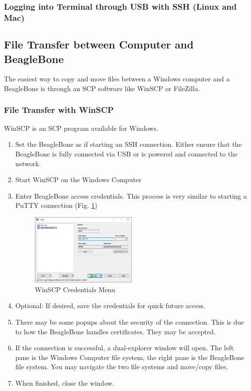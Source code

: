         \subsubsection{Logging into Terminal through USB with SSH (Linux and Mac)}
        
        \subsection{File Transfer between Computer and BeagleBone}
        The easiest way to copy and move files between a Windows computer and a BeagleBone is through an SCP software like WinSCP or FileZilla.
            \subsubsection{File Transfer with WinSCP}
            WinSCP is an SCP program available for Windows.
            \begin{enumerate}
                \item Set the BeagleBone as if starting an SSH connection. Either ensure that the BeagleBone is fully connected via USB or is powered and connected to the network.
                \item Start WinSCP on the Windows Computer
                \item Enter BeagleBone access credentials. This process is very similar to starting a PuTTY connection (Fig. \ref{fig:WinSCPCredentials})
                \begin{figure}[H]
                    \centering
                    \includegraphics[width=0.5\textwidth]{images/beagleboneblack_truckcape_v4_images/WinSCPcredentials.png}
                    \caption{WinSCP Credentials Menu}
                    \label{fig:WinSCPCredentials}
                \end{figure}
                \item Optional: If desired, save the credentials for quick future access.
                \item There may be some popups about the security of the connection. This is due to how the BeagleBone handles certificates. They may be accepted.
                \item If the connection is successful, a dual-explorer window will open. The left pane is the Windows Computer file system, the right pane is the BeagleBone file system. You may navigate the two file systems and move/copy files.
                \item When finished, close the window.
            \end{enumerate}
